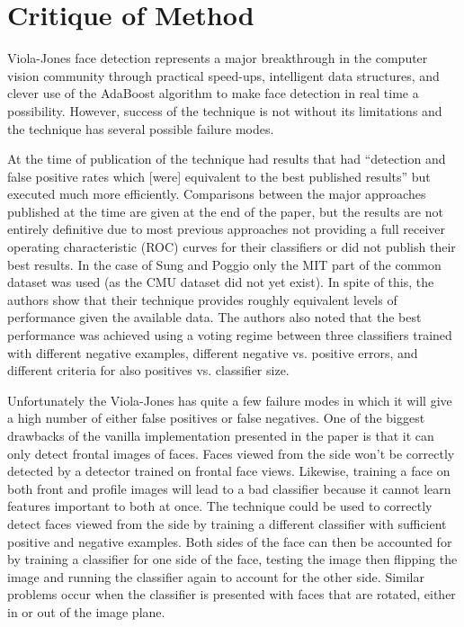 \documentclass[conference]{IEEEtran}
\begin{document}
\section{Critique of Method} \label{sec:critique-of-method}
Viola-Jones face detection represents a major breakthrough in the computer vision community through practical speed-ups, intelligent data structures, and clever use of the AdaBoost algorithm to make face detection in real time a possibility. However, success of the technique is not without its limitations and the technique has several possible failure modes.

At the time of publication of the technique had results that had ``detection and false positive rates which [were] equivalent to the best published results'' \cite{viola2004robust} but executed much more efficiently. Comparisons between the major approaches published at the time are given at the end of the paper, but the results are not entirely definitive due to most previous approaches not providing a full receiver operating characteristic (ROC) curves for their classifiers or did not publish their best results. In the case of Sung and Poggio \cite{sung1998example} only the MIT part of the common dataset was used (as the CMU dataset did not yet exist). In spite of this, the authors show that their technique provides roughly equivalent levels of performance given the available data. The authors also noted that the best performance was achieved using a voting regime between three classifiers trained with different negative examples, different negative vs. positive errors, and different criteria for also positives vs. classifier size.

Unfortunately the Viola-Jones has quite a few failure modes in which it will give a high number of either false positives or false negatives. One of the biggest drawbacks of the vanilla implementation presented in the paper is that it can only detect frontal images of faces. Faces viewed from the side won't be correctly detected by a detector trained on frontal face views. Likewise, training a face on both front and profile images will lead to a bad classifier because it cannot learn features important to both at once. The technique could be used to correctly detect faces viewed from the side by training a different classifier with sufficient positive and negative examples. Both sides of the face can then be accounted for by training a classifier for one side of the face, testing the image then flipping the image and running the classifier again to account for the other side. Similar problems occur when the classifier is presented with faces that are rotated, either in or out of the image plane. 
\end{document}

